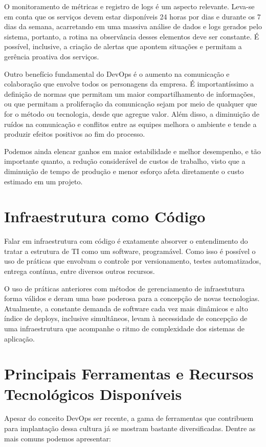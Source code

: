 O monitoramento de métricas e registro de logs é um aspecto relevante. Leva-se em conta que os serviços devem estar disponíveis 24 horas por dias e durante os 7 dias da semana, acarretando em uma massiva análise de dados e logs gerados pelo sistema, portanto, a rotina na observância desses elementos deve ser constante. É possível, inclusive, a criação de alertas que apontem situações e permitam a gerência proativa dos serviços.

Outro benefício fundamental do DevOps é o aumento na comunicação e colaboração que envolve todos os personagens da empresa. É importantíssimo a definição de normas que permitam um maior compartilhamento de informações, ou que permitam a proliferação da comunicação sejam por meio de qualquer que for o método ou tecnologia, desde que agregue valor. Além disso, a diminuição de ruídos na comunicação e conflitos entre as equipes melhora o ambiente e tende a produzir efeitos positivos ao fim do processo.

Podemos ainda elencar ganhos em maior estabilidade e melhor desempenho, e tão importante quanto, a redução considerável de custos de trabalho, visto que a diminuição de tempo de produção e menor esforço afeta diretamente o custo estimado em um projeto.


\section{Infraestrutura como Código}
Falar em infraestrutura com código é exatamente absorver o entendimento do tratar a estrutura de TI como um software, programável. Como isso é possível o uso de práticas que envolvam o controle por versionamento, testes automatizados, entrega contínua, entre diversos outros recursos.

O uso de práticas anteriores com métodos de gerenciamento de infraestutura forma válidos e deram uma base poderosa para a concepção de novas tecnologias. Atualmente, a constante demanda de software cada vez mais dinâmicos e alto índice de deploys, inclusive simultâneos, levam à necessidade de concepção de uma infraestrutura que acompanhe o ritmo de complexidade dos sistemas de aplicação.



\section{Principais Ferramentas e Recursos Tecnológicos Disponíveis}
Apesar do conceito DevOps ser recente, a gama de ferramentas que contribuem para implantação dessa cultura já se mostram bastante diversificadas. Dentre as mais comuns podemos apresentar:

